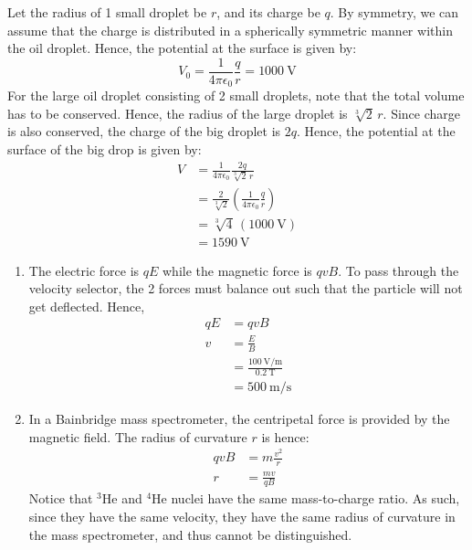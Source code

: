 \begin{solution}
    \begin{subsolution}
        Let the radius of 1 small droplet be $r$, and its charge be $q$. By symmetry, we can assume that the charge is distributed in a spherically symmetric manner within the oil droplet. Hence, the potential at the surface is given by:
        \[V_0=\frac{1}{4\pi\epsilon_0}\frac{q}{r}=\qty{1000}{\V}\]
        For the large oil droplet consisting of 2 small droplets, note that the total volume has to be conserved. Hence, the radius of the large droplet is \(\sqrt[3]{2}\,r\). Since charge is also conserved, the charge of the big droplet is \(2q\). Hence, the potential at the surface of the big drop is given by:
        \begin{align*}
            V&=\frac{1}{4\pi\epsilon_0}\frac{2q}{\sqrt[3]{2}\,r}\\
            &=\frac{2}{\sqrt[3]{2}}\left(\frac{1}{4\pi\epsilon_0}\frac{q}{r}\right)\\
            &=\sqrt[3]{4}\,(\qty{1000}{\V})\\
            &=\boxed{\qty{1590}{\V}}
        \end{align*}
    \end{subsolution}
    
    \begin{subsolution}
        \renewcommand{\theenumi}{(\alph{enumi})}
        \begin{enumerate}
            \item The electric force is \(qE\) while the magnetic force is \(qvB\). To pass through the velocity selector, the 2 forces must balance out such that the particle will not get deflected. Hence,
            \begin{align*}
                qE&=qvB\\
                v&=\frac{E}{B}\\
                &=\frac{\qty{100}{\V\per\m}}{\qty{0.2}{\tesla}}\\
                &=\boxed{\qty{500}{\m\per\s}}
            \end{align*}
            \item In a Bainbridge mass spectrometer, the centripetal force is provided by the magnetic field. The radius of curvature $r$ is hence:
            \begin{align*}
                qvB&=m\frac{v^2}{r}\\
                r&=\frac{mv}{qB}
            \end{align*}
            Notice that ${}^{3}\mathrm{He}$ and ${}^{4}\mathrm{He}$ nuclei have the same mass-to-charge ratio. As such, since they have the same velocity, they have the same radius of curvature in the mass spectrometer, and thus $\boxed{\text{cannot}}$ be distinguished.
        \end{enumerate}
    \end{subsolution}
\end{solution}

